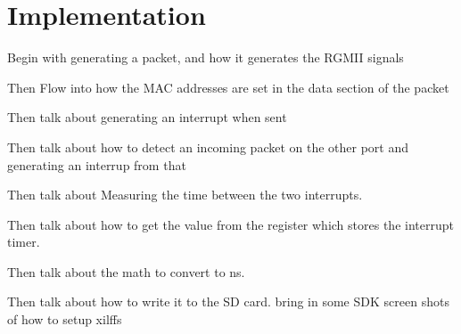 \chapter{Implementation}\label{C:impl}

Begin with generating a packet, and how it generates the RGMII signals

Then Flow into how the MAC addresses are set in the data section of the packet

Then talk about generating an interrupt when sent

Then talk about how to detect an incoming packet on the other port and generating an interrup from that

Then talk about Measuring the time between the two interrupts. 

Then talk about how to get the value from the register which stores the interrupt timer.

Then talk about the math to convert to ns.

Then talk about how to write it to the SD card. bring in some SDK screen shots of how to setup xilffs










